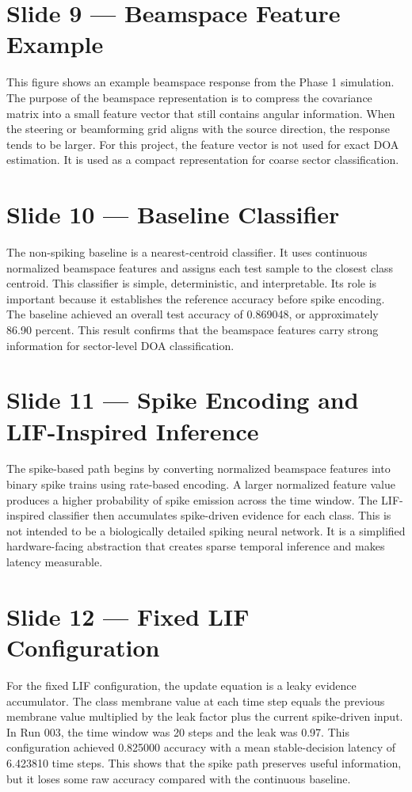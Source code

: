 \documentclass[11pt]{article}
\begin{document}
\section*{Slide 9 — Beamspace Feature Example}
This figure shows an example beamspace response from the Phase 1 simulation. The purpose of the beamspace representation is to compress the covariance matrix into a small feature vector that still contains angular information. When the steering or beamforming grid aligns with the source direction, the response tends to be larger. For this project, the feature vector is not used for exact DOA estimation. It is used as a compact representation for coarse sector classification.

\section*{Slide 10 — Baseline Classifier}
The non-spiking baseline is a nearest-centroid classifier. It uses continuous normalized beamspace features and assigns each test sample to the closest class centroid. This classifier is simple, deterministic, and interpretable. Its role is important because it establishes the reference accuracy before spike encoding. The baseline achieved an overall test accuracy of 0.869048, or approximately 86.90 percent. This result confirms that the beamspace features carry strong information for sector-level DOA classification.

\section*{Slide 11 — Spike Encoding and LIF-Inspired Inference}
The spike-based path begins by converting normalized beamspace features into binary spike trains using rate-based encoding. A larger normalized feature value produces a higher probability of spike emission across the time window. The LIF-inspired classifier then accumulates spike-driven evidence for each class. This is not intended to be a biologically detailed spiking neural network. It is a simplified hardware-facing abstraction that creates sparse temporal inference and makes latency measurable.

\section*{Slide 12 — Fixed LIF Configuration}
For the fixed LIF configuration, the update equation is a leaky evidence accumulator. The class membrane value at each time step equals the previous membrane value multiplied by the leak factor plus the current spike-driven input. In Run 003, the time window was 20 steps and the leak was 0.97. This configuration achieved 0.825000 accuracy with a mean stable-decision latency of 6.423810 time steps. This shows that the spike path preserves useful information, but it loses some raw accuracy compared with the continuous baseline.
\end{document}
